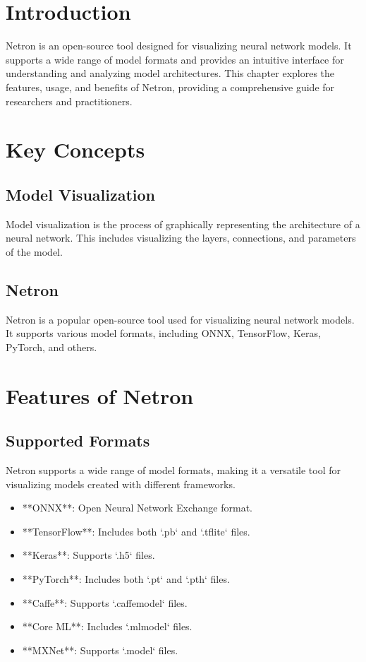 \section{Introduction}
Netron is an open-source tool designed for visualizing neural network models. It supports a wide range of model formats and provides an intuitive interface for understanding and analyzing model architectures. This chapter explores the features, usage, and benefits of Netron, providing a comprehensive guide for researchers and practitioners.

\section{Key Concepts}

\subsection{Model Visualization}
Model visualization is the process of graphically representing the architecture of a neural network. This includes visualizing the layers, connections, and parameters of the model.

\subsection{Netron}
Netron is a popular open-source tool used for visualizing neural network models. It supports various model formats, including ONNX, TensorFlow, Keras, PyTorch, and others.

\section{Features of Netron}

\subsection{Supported Formats}
Netron supports a wide range of model formats, making it a versatile tool for visualizing models created with different frameworks.

\begin{itemize}
    \item **ONNX**: Open Neural Network Exchange format.
    \item **TensorFlow**: Includes both `.pb` and `.tflite` files.
    \item **Keras**: Supports `.h5` files.
    \item **PyTorch**: Includes both `.pt` and `.pth` files.
    \item **Caffe**: Supports `.caffemodel` files.
    \item **Core ML**: Includes `.mlmodel` files.
    \item **MXNet**: Supports `.model` files.
\end{itemize}

